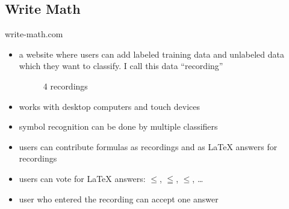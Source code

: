 \subsection{Write Math}

\begin{frame}{write-math.com}
    \begin{itemize}
        \item a website where users can add labeled training data and unlabeled
              data which they want to classify. I call this data \enquote{recording}
        \begin{figure}[ht]
            \centering
            \qquad
            \qquad
            \qquad
            \caption*{4 recordings}
        \end{figure}
        \item works with desktop computers and touch devices
        \item symbol recognition can be done by multiple classifiers
        \item users can contribute formulas as recordings and as \LaTeX{} answers
              for recordings
        \item users can vote for \LaTeX{} answers:
              \Large $\leq$, $\leqq$, $\leqslant$, \dots \normalsize
        \item user who entered the recording can accept one answer
    \end{itemize}
\end{frame}

